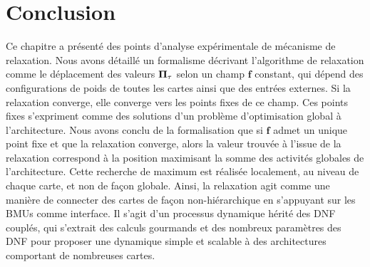 \documentclass[../main]{subfiles}
\begin{document}

%



\section{Conclusion}

Ce chapitre a présenté des points d'analyse expérimentale de mécanisme de relaxation. 
Nous avons détaillé un formalisme décrivant l'algorithme de relaxation comme le déplacement des valeurs $\mathbf{\Pi}_\tau$ selon un champ $\mathbf{f}$ constant, qui dépend des configurations de poids de toutes les cartes ainsi que des entrées externes. 
Si la relaxation converge, elle converge vers les points fixes de ce champ. 
Ces points fixes s'expriment comme des solutions d'un problème d'optimisation global à l'architecture.
Nous avons conclu de la formalisation que si $\mathbf{f}$ admet un unique point fixe et que la relaxation converge, alors la valeur trouvée à l'issue de la relaxation correspond à la position maximisant la somme des activités globales de l'architecture.
Cette recherche de maximum est réalisée localement, au niveau de chaque carte, et non de façon globale. Ainsi, la relaxation agit comme une manière de connecter des cartes de façon non-hiérarchique en s'appuyant sur les BMUs comme interface. Il s'agit d'un processus dynamique hérité des DNF couplés, qui s'extrait des calculs gourmands et des nombreux paramètres des DNF pour proposer une dynamique simple et scalable à des architectures comportant de nombreuses cartes.
\end{document}

